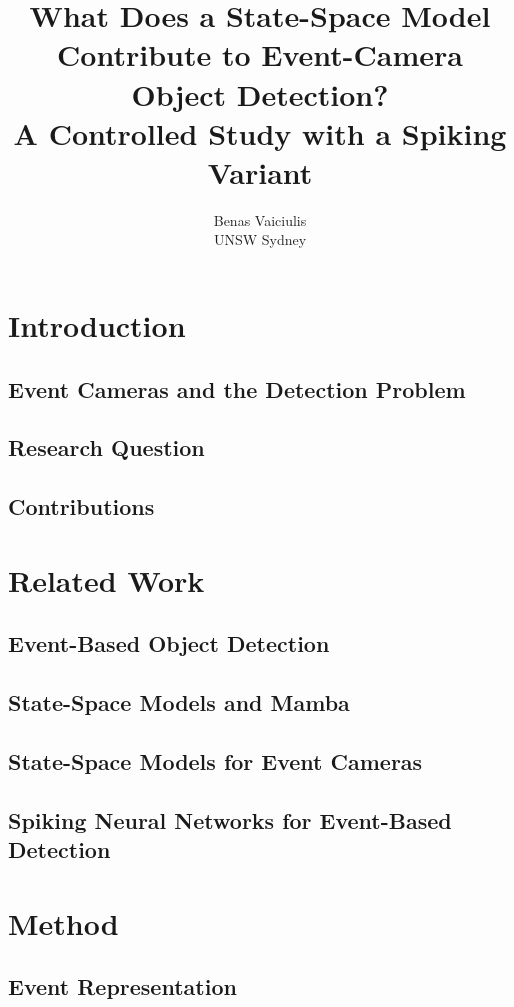 \documentclass[11pt,a4paper]{article}
\title{What Does a State-Space Model Contribute to Event-Camera Object Detection?\\
\large A Controlled Study with a Spiking Variant}
\author{Benas Vaiciulis\\UNSW Sydney}
\date{}
\begin{document}
\maketitle

\begin{abstract}
\end{abstract}

\section{Introduction}
\subsection{Event Cameras and the Detection Problem}
\subsection{Research Question}
\subsection{Contributions}

\section{Related Work}
\subsection{Event-Based Object Detection}
\subsection{State-Space Models and Mamba}
\subsection{State-Space Models for Event Cameras}
\subsection{Spiking Neural Networks for Event-Based Detection}

\section{Method}
\subsection{Event Representation}
\end{document}
